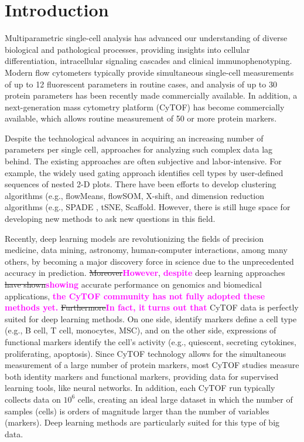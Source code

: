 \documentclass[graybox]{svmult}
\newcommand{\claudia}[2]{\sout{#1}\textcolor{magenta}{\textbf{#2}}}
\begin{document}
\section{Introduction}

Multiparametric single-cell analysis has advanced our understanding of
diverse biological and pathological processes, providing insights into
cellular differentiation, intracellular signaling cascades and
clinical immunophenotyping. Modern flow cytometers typically provide
simultaneous single-cell measurements of up to 12 fluorescent
parameters in routine cases, and analysis of up to 30 protein
parameters has been recently made commercially available. In addition,
a next-generation mass cytometry platform (CyTOF) has become
commercially available, which allows routine measurement of 50 or more
protein markers.

Despite the technological advances in acquiring an increasing number
of parameters per single cell, approaches for analyzing such complex
data lag behind. The existing approaches are often subjective and
labor-intensive. For example, the widely used gating approach
identifies cell types by user-defined sequences of nested 2-D
plots. There have been efforts to develop clustering algorithms (e.g.,
flowMeans\cite{Aghaeepour2010}, flowSOM\cite{VanGassen2015},
X-shift\cite{Samusik2016}, and dimension reduction algorithms
(e.g., SPADE \cite{Qiu2011}, tSNE\cite{vanderMaaten2008},
Scaffold\cite{Spitzer2015}. However, there is still huge space
for developing new methods to ask new questions in this field.

Recently, deep learning models are revolutionizing the fields of
precision medicine, data mining, astronomy, human-computer
interactions, among many others, by becoming a major discovery force
in science due to the unprecedented accuracy in prediction.
\claudia{Moreover}{However}, \claudia{}{despite} deep learning
approaches \claudia{have shown}{showing} accurate performance on
genomics and biomedical
applications\cite{Ciresan2013,Denas2013,Fakoor2013,Leung2014,CruzRoa2014,Li2017,Mobadersany2018},
\claudia{}{the CyTOF community has not fully adopted these
  methods yet.}  \claudia{Furthermore}{In fact, it turns out that}
CyTOF data is perfectly suited for deep learning methods.  On one
side, identify markers define a cell type (e.g., B cell, T cell,
monocytes, MSC), and on the other side, expressions of functional
markers identify the cell's activity (e.g., quiescent, secreting
cytokines, proliferating, apoptosis). Since CyTOF technology allows
for the simultaneous measurement of a large number of protein markers,
most CyTOF studies measure both identity markers and functional
markers, providing data for supervised learning tools, like neural
networks.  In addition, each CyTOF run typically collects data on
$10^6$ cells, creating an ideal large dataset in which the number of
samples (cells) is orders of magnitude larger than the number of
variables (markers). Deep learning methods are particularly suited for
this type of big data.
\end{document}
